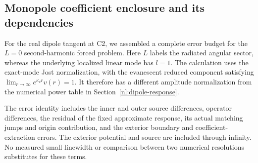 \subsection{Monopole coefficient enclosure and its dependencies}
\label{nl:conditional-monopole}
For the real dipole tangent at C2, we assembled a complete error budget
for the $L=0$ second-harmonic forced problem. Here $L$ labels the
radiated angular sector, whereas the underlying localized linear mode
has $l=1$. The calculation uses the exact-mode Jost normalization,
with the evanescent reduced component satisfying
$\lim_{r\to\infty}e^{\kappa_c r}v(r)=1$.
It therefore has a different amplitude normalization from the numerical
power table in Section~\ref{nl:dipole-response}.

The error identity includes the inner and outer source differences,
operator differences, the residual of the fixed approximate response,
its actual matching jumps and origin contribution, and the exterior
boundary and coefficient-extraction errors. The exterior potential and
source are included through infinity. No measured small linewidth or
comparison between two numerical resolutions substitutes for these terms.

